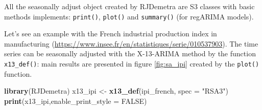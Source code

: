 \documentclass[]{article}
\newenvironment{Shaded}{\begin{snugshade}}{\end{snugshade}}
\newcommand{\KeywordTok}[1]{\textcolor[rgb]{0.13,0.29,0.53}{\textbf{#1}}}
\newcommand{\DataTypeTok}[1]{\textcolor[rgb]{0.13,0.29,0.53}{#1}}
\newcommand{\StringTok}[1]{\textcolor[rgb]{0.31,0.60,0.02}{#1}}
\newcommand{\OtherTok}[1]{\textcolor[rgb]{0.56,0.35,0.01}{#1}}
\newcommand{\NormalTok}[1]{#1}
\begin{document}
All the seasonally adjust object created by RJDemetra are S3 classes
with basic methods implements: \texttt{print()}, \texttt{plot()} and
\texttt{summary()} (for regARIMA models).

Let's see an example with the French industrial production index in
manufacturing
(\url{https://www.insee.fr/en/statistiques/serie/010537903}). The time
series can be seasonally adjusted with the X-13-ARIMA method by the
function \texttt{x13\_def()}: main results are presented in figure
\ref{fig:sa_ipi} created by the \texttt{plot()} function.

\begin{Shaded}
\begin{Highlighting}[]
\KeywordTok{library}\NormalTok{(RJDemetra)}
\NormalTok{x13_ipi <-}\StringTok{ }\KeywordTok{x13_def}\NormalTok{(ipi_french, }\DataTypeTok{spec =} \StringTok{"RSA3"}\NormalTok{)}
\KeywordTok{print}\NormalTok{(x13_ipi,}\DataTypeTok{enable_print_style =} \OtherTok{FALSE}\NormalTok{)}
\end{Highlighting}
\end{Shaded}
\end{document}

